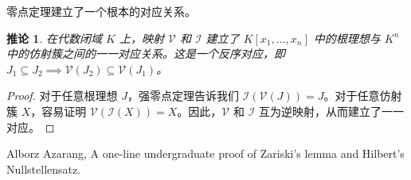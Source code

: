\documentclass[UTF8]{ctexart}
\newtheorem{corollary}[theorem]{推论}
\newcommand{\V}{\mathcal{V}}
\newcommand{\I}{\mathcal{I}}
\begin{document}
零点定理建立了一个根本的对应关系。

\begin{corollary}
在代数闭域 $K$ 上，映射 $\V$ 和 $\I$ 建立了 $K[x_1, \dots, x_n]$ 中的根理想与 $K^n$ 中的仿射簇之间的一一对应关系。这是一个反序对应，即 $J_1 \subseteq J_2 \implies \V(J_2) \subseteq \V(J_1)$。
\end{corollary}

\begin{proof}
对于任意根理想 $J$，强零点定理告诉我们 $\I(\V(J))=J$。对于任意仿射簇 $X$，容易证明 $\V(\I(X))=X$。因此，$\V$ 和 $\I$ 互为逆映射，从而建立了一一对应。
\end{proof}

\begin{thebibliography}{1}
Alborz Azarang, A one-line undergraduate proof of Zariski's lemma and Hilbert's Nullstellensatz.
\end{thebibliography}
\end{document}
